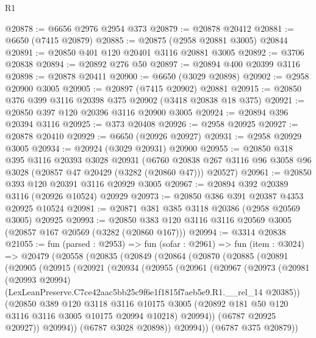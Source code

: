 \begin{lexlean}{R1}
\begin{coremodule}
@20878 := @6656 @2976 @2954 @373
@20879 := @20878 @20412
@20881 := @6650 (@7415 @20879)
@20885 := @20875 (@2958 @20881 @3005) @20844
@20891 := @20850 @401 @120 @20401 @3116 @20881 @3005
@20892 := @3706 @20838
@20894 := @20892 @276 @50
@20897 := @20894 @400 @20399 @3116
@20898 := @20878 @20411
@20900 := @6650 (@3029 @20898)
@20902 := @2958 @20900 @3005
@20905 := @20897 (@7415 @20902) @20881
@20915 := @20850 @376 @399 @3116 @20398 @375 @20902 (@3418 @20838 @18 @375)
@20921 := @20850 @397 @120 @20396 @3116 @20900 @3005
@20924 := @20894 @396 @20394 @3116
@20925 := @373 @20408
@20926 := @2958 @20925
@20927 := @20878 @20410
@20929 := @6650 (@20926 @20927)
@20931 := @2958 @20929 @3005
@20934 := @20924 (@3029 @20931) @20900
@20955 := @20850
    @318
    @395
    @3116
    @20393
    @3028
    @20931
    (@6760 @20838 @267 @3116 @96 @3058 @96 @3028 (@20857 @47 @20429 (@3282 (@20860 @47))) @20527)
@20961 := @20850 @393 @120 @20391 @3116 @20929 @3005
@20967 := @20894 @392 @20389 @3116 (@20926 @10524) @20929
@20973 := @20850 @386 @391 @20387 @4353 @20925 @10524
@20981 := @20871 @381 @385 @3118 @20386 (@2958 @20569 @3005) @20925
@20993 := @20850 @383 @120 @3116 @3116 @20569 @3005 (@20857 @167 @20569 (@3282 (@20860 @167)))
@20994 := @3314 @20838
@21055 := fun (parsed : @2953) =>
  fun (sofar : @2961) =>
  fun (item : @3024) =>
  @20479
    (@20558
      (@20835
        (@20849
          (@20864
            (@20870
              (@20885
                (@20891
                  (@20905
                    (@20915
                      (@20921
                        (@20934
                          (@20955
                            (@20961
                              (@20967
                                (@20973
                                  (@20981
                                    (@20993 @20994)
                                    (LexLeanPreserve.C7ce42aac5bb25c9f6e1f1815f7aeb5e9.R1.__rel_14
                                      @20385))
                                  (@20850
                                    @389
                                    @120
                                    @3118
                                    @3116
                                    @10175
                                    @3005
                                    (@20892 @181 @50 @120 @3116 @3116 @3005 @10175 @20994 @10218)
                                    @20994))
                                (@6787 @20925 @20927))
                              @20994))
                          (@6787 @3028 @20898))
                        @20994))
                    (@6787 @375 @20879))

\end{coremodule}
\end{lexlean}

